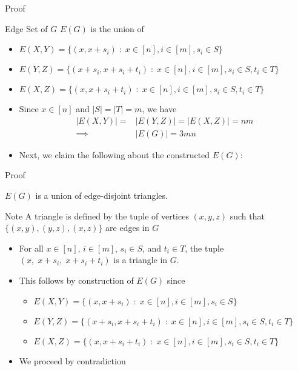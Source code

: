 \begin{frame}{Proof}

\begin{block}{Edge Set of $G$}
$E(G)$ is the union of
\begin{itemize}
	\item $E(X,Y) = \big\lbrace (x, x+s_i)\;\colon\; x\in [n], i \in [m], s_i \in S \big\rbrace$
	\item $E(Y,Z) = \big\lbrace (x+s_i, x+s_i+t_i)\;\colon\; x\in[n], i\in[m], s_i \in S, t_i \in T \big\rbrace$
	\item $E(X,Z) = \big\lbrace (x, x+s_i+t_i)\;\colon\; x\in[n], i\in[m], s_i \in S, t_i \in T \big\rbrace$
\end{itemize}
\end{block}
\begin{itemize}
	\item<2-> Since $x \in [n]$ and $|S|=|T|=m$, we have
	\begin{align*}
	|E(X,Y)| = &|E(Y,Z)| = |E(X,Z)| = nm\\
	\implies &|E(G)| = 3mn
	\end{align*}
	
	\item<3-> Next, we claim the following about the constructed $E(G)$:
\end{itemize}

\end{frame}

\begin{frame}{Proof}

{
\begin{claim}
	$E(G)$ is a union of edge-disjoint triangles.
\end{claim}}

\begin{block}{Note}
	A triangle is defined by the tuple of vertices $(x,y,z)$ such that $\big\lbrace (x,y), (y,z), (x,z) \big\rbrace$ are edges in $G$
\end{block}

\begin{itemize}
	\item<2-> For all $x\in [n]$, $i\in [m]$, $s_i \in S$, and $t_i \in T$, the tuple $(x,\; x+s_i,\; x+s_i+t_i)$ is a triangle in $G$.
	
	\item<3-> This follows by construction of $E(G)$ since
	\begin{itemize}
		\item $E(X,Y) = \big\lbrace (x, x+s_i)\;\colon\; x\in [n], i \in [m], s_i \in S \big\rbrace$
		\item $E(Y,Z) = \big\lbrace (x+s_i, x+s_i+t_i)\;\colon\; x\in[n], i\in[m], s_i \in S, t_i \in T \big\rbrace$
		\item $E(X,Z) = \big\lbrace (x, x+s_i+t_i)\;\colon\; x\in[n], i\in[m], s_i \in S, t_i \in T \big\rbrace$
	\end{itemize}
	\item<4-> We proceed by contradiction
\end{itemize}
\end{frame}

